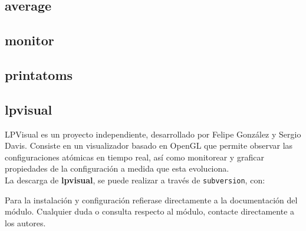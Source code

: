 \subsection {average}

\subsection {monitor}

\subsection {printatoms}

\subsection{lpvisual}

LPVisual es un proyecto independiente, desarrollado por Felipe Gonz\'alez y Sergio Davis. Consiste en un visualizador basado en OpenGL que permite observar las configuraciones at\'omicas en tiempo real, as\'i como monitorear y graficar propiedades de la configuraci\'on a medida que esta evoluciona.\\


La descarga de \textbf{lpvisual}, se puede realizar a trav\'es de \verb|subversion|, con:


Para la instalaci\'on y configuraci\'on refierase directamente a la documentaci\'on del m\'odulo. Cualquier duda o consulta respecto al m\'odulo, contacte directamente a los autores.\\

